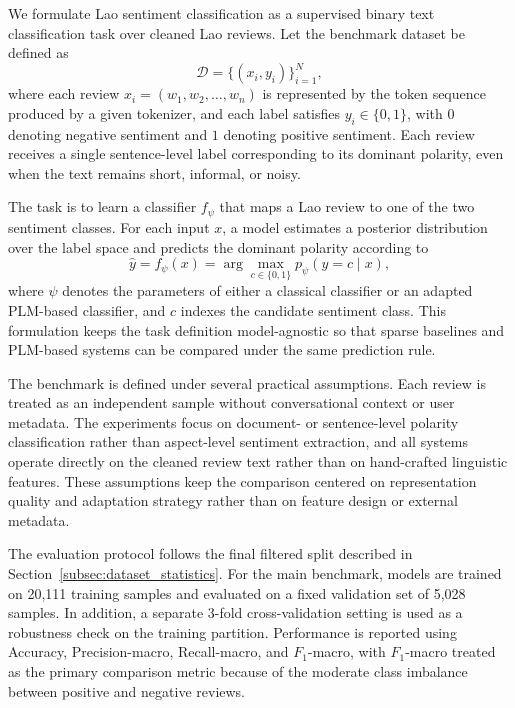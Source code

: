 \documentclass[conference, onecolumn]{IEEEtran}
\begin{document}
We formulate Lao sentiment classification as a supervised binary text classification task over cleaned Lao reviews. Let the benchmark dataset be defined as
\begin{equation}
\mathcal{D} = \{(x_i, y_i)\}_{i=1}^{N},
\label{eq:dataset}
\end{equation}
where each review $x_i = (w_1, w_2, \ldots, w_n)$ is represented by the token sequence produced by a given tokenizer, and each label satisfies $y_i \in \{0,1\}$, with $0$ denoting negative sentiment and $1$ denoting positive sentiment. Each review receives a single sentence-level label corresponding to its dominant polarity, even when the text remains short, informal, or noisy.

The task is to learn a classifier $f_{\psi}$ that maps a Lao review to one of the two sentiment classes. For each input $x$, a model estimates a posterior distribution over the label space and predicts the dominant polarity according to
\begin{equation}
\hat{y} = f_{\psi}(x) = \arg\max_{c \in \{0,1\}} p_{\psi}(y=c \mid x),
\label{eq:prediction}
\end{equation}
where $\psi$ denotes the parameters of either a classical classifier or an adapted PLM-based classifier, and $c$ indexes the candidate sentiment class. This formulation keeps the task definition model-agnostic so that sparse baselines and PLM-based systems can be compared under the same prediction rule.

The benchmark is defined under several practical assumptions. Each review is treated as an independent sample without conversational context or user metadata. The experiments focus on document- or sentence-level polarity classification rather than aspect-level sentiment extraction, and all systems operate directly on the cleaned review text rather than on hand-crafted linguistic features. These assumptions keep the comparison centered on representation quality and adaptation strategy rather than on feature design or external metadata.

The evaluation protocol follows the final filtered split described in Section~\ref{subsec:dataset_statistics}. For the main benchmark, models are trained on 20,111 training samples and evaluated on a fixed validation set of 5,028 samples. In addition, a separate 3-fold cross-validation setting is used as a robustness check on the training partition. Performance is reported using Accuracy, Precision-macro, Recall-macro, and $F_1$-macro, with $F_1$-macro treated as the primary comparison metric because of the moderate class imbalance between positive and negative reviews.
\end{document}
